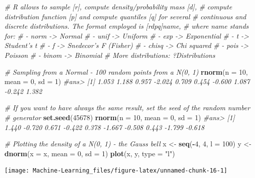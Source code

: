 \documentclass[]{book}
\newenvironment{Shaded}{\begin{snugshade}}{\end{snugshade}}
\newcommand{\KeywordTok}[1]{\textcolor[rgb]{0.13,0.29,0.53}{\textbf{#1}}}
\newcommand{\DataTypeTok}[1]{\textcolor[rgb]{0.13,0.29,0.53}{#1}}
\newcommand{\DecValTok}[1]{\textcolor[rgb]{0.00,0.00,0.81}{#1}}
\newcommand{\StringTok}[1]{\textcolor[rgb]{0.31,0.60,0.02}{#1}}
\newcommand{\CommentTok}[1]{\textcolor[rgb]{0.56,0.35,0.01}{\textit{#1}}}
\newcommand{\OperatorTok}[1]{\textcolor[rgb]{0.81,0.36,0.00}{\textbf{#1}}}
\newcommand{\NormalTok}[1]{#1}
\theoremstyle{definition}
\theoremstyle{definition}
\theoremstyle{definition}
\theoremstyle{remark}
\begin{document}
\begin{Shaded}
\begin{Highlighting}[]
\CommentTok{# R allows to sample [r], compute density/probability mass [d],}
\CommentTok{# compute distribution function [p] and compute quantiles [q] for several}
\CommentTok{# continuous and discrete distributions. The format employed is [rdpq]name,}
\CommentTok{# where name stands for:}
\CommentTok{# - norm -> Normal}
\CommentTok{# - unif -> Uniform}
\CommentTok{# - exp -> Exponential}
\CommentTok{# - t -> Student's t}
\CommentTok{# - f -> Snedecor's F (Fisher)}
\CommentTok{# - chisq -> Chi squared}
\CommentTok{# - pois -> Poisson}
\CommentTok{# - binom -> Binomial}
\CommentTok{# More distributions: ?Distributions}


\CommentTok{# Sampling from a Normal - 100 random points from a N(0, 1)}
\KeywordTok{rnorm}\NormalTok{(}\DataTypeTok{n =} \DecValTok{10}\NormalTok{, }\DataTypeTok{mean =} \DecValTok{0}\NormalTok{, }\DataTypeTok{sd =} \DecValTok{1}\NormalTok{)}
\CommentTok{#ans>  [1]  1.053  1.188  0.957 -2.024  0.709  0.454 -0.600  1.087 -0.242  1.382}

\CommentTok{# If you want to have always the same result, set the seed of the random number}
\CommentTok{# generator}
\KeywordTok{set.seed}\NormalTok{(}\DecValTok{45678}\NormalTok{)}
\KeywordTok{rnorm}\NormalTok{(}\DataTypeTok{n =} \DecValTok{10}\NormalTok{, }\DataTypeTok{mean =} \DecValTok{0}\NormalTok{, }\DataTypeTok{sd =} \DecValTok{1}\NormalTok{)}
\CommentTok{#ans>  [1]  1.440 -0.720  0.671 -0.422  0.378 -1.667 -0.508  0.443 -1.799 -0.618}

\CommentTok{# Plotting the density of a N(0, 1) - the Gauss bell}
\NormalTok{x <-}\StringTok{ }\KeywordTok{seq}\NormalTok{(}\OperatorTok{-}\DecValTok{4}\NormalTok{, }\DecValTok{4}\NormalTok{, }\DataTypeTok{l =} \DecValTok{100}\NormalTok{)}
\NormalTok{y <-}\StringTok{ }\KeywordTok{dnorm}\NormalTok{(}\DataTypeTok{x =}\NormalTok{ x, }\DataTypeTok{mean =} \DecValTok{0}\NormalTok{, }\DataTypeTok{sd =} \DecValTok{1}\NormalTok{)}
\KeywordTok{plot}\NormalTok{(x, y, }\DataTypeTok{type =} \StringTok{"l"}\NormalTok{)}
\end{Highlighting}
\end{Shaded}

\begin{center}\texttt{[image: Machine-Learning\_files/figure-latex/unnamed-chunk-16-1]} \end{center}
\end{document}
